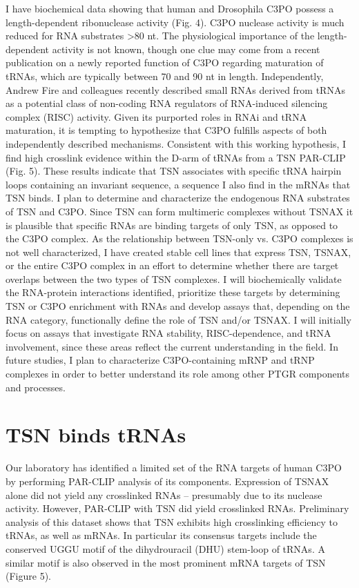 \documentclass[12pt]{rockefeller}
\begin{document}
I have biochemical data showing that human and Drosophila C3PO possess a length-dependent ribonuclease activity (Fig. 4). C3PO nuclease activity is much reduced for RNA substrates >80 nt. The physiological importance of the length-dependent activity is not known, though one clue may come from a recent publication on a newly reported function of C3PO regarding maturation of tRNAs, which are typically between 70 and 90 nt in length. Independently, Andrew Fire and colleagues recently described small RNAs derived from tRNAs as a potential class of non-coding RNA regulators of RNA-induced silencing complex (RISC) activity. Given its purported roles in RNAi and tRNA maturation, it is tempting to hypothesize that C3PO fulfills aspects of both independently described mechanisms. Consistent with this working hypothesis, I find high crosslink evidence within the D-arm of tRNAs from a TSN PAR-CLIP (Fig. 5). These results indicate that TSN associates with specific tRNA hairpin loops containing an invariant sequence, a sequence I also find in the mRNAs that TSN binds. I plan to determine and characterize the endogenous RNA substrates of TSN and C3PO. Since TSN can form multimeric complexes without TSNAX it is plausible that specific RNAs are binding targets of only TSN, as opposed to the C3PO complex. As the relationship between TSN-only vs. C3PO complexes is not well characterized, I have created stable cell lines that express TSN, TSNAX, or the entire C3PO complex in an effort to determine whether there are target overlaps between the two types of TSN complexes. I will biochemically validate the RNA-protein interactions identified, prioritize these targets by determining TSN or C3PO enrichment with RNAs and develop assays that, depending on the RNA category, functionally define the role of TSN and/or TSNAX. I will initially focus on assays that investigate RNA stability, RISC-dependence, and tRNA involvement, since these areas reflect the current understanding in the field. In future studies, I plan to characterize C3PO-containing mRNP and tRNP complexes in order to better understand its role among other PTGR components and processes.

\section{TSN binds tRNAs}
Our laboratory has identified a limited set of the RNA targets of human C3PO by performing PAR-CLIP analysis of its components. Expression of TSNAX alone did not yield any crosslinked RNAs – presumably due to its nuclease activity. However, PAR-CLIP with TSN did yield crosslinked RNAs. Preliminary analysis of this dataset shows that TSN exhibits high crosslinking efficiency to tRNAs, as well as mRNAs. In particular its consensus targets include the conserved UGGU motif of the dihydrouracil (DHU) stem-loop of tRNAs. A similar motif is also observed in the most prominent mRNA targets of TSN (Figure 5).
\end{document}
